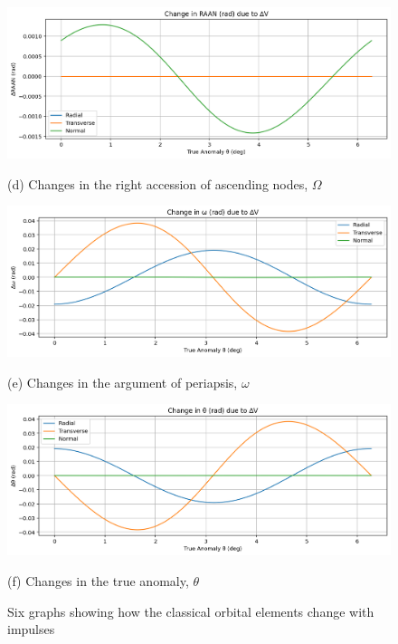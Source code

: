 \documentclass[12pt,twocolumn]{article}  %
\begin{document}
\begin{figure}[H]
    \centering

    \begin{minipage}[t]{0.48\textwidth}


        \includegraphics[width=\linewidth]{Images/del_Omega.png}
        \caption*{(d) Changes in the right accession of ascending nodes, $\Omega$}
    \end{minipage}
    \hfill
    \vspace{2em}

    \begin{minipage}[t]{0.48\textwidth}
        \centering
        \includegraphics[width=\linewidth]{Images/del_lomega.png}
        \caption*{(e) Changes in the argument of periapsis, $\omega$}
        \vspace{2em}

        \includegraphics[width=\linewidth]{Images/del_theta.png}
        \caption*{(f) Changes in the true anomaly, $\theta$}
    \end{minipage}

    \caption{Six graphs showing how the classical orbital elements change with impulses}
\end{figure}
\end{document}
